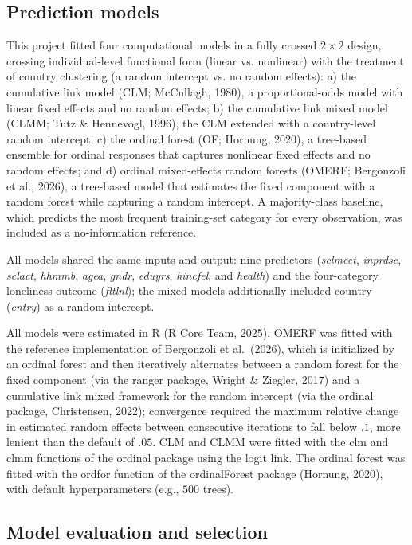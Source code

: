 \documentclass[12pt]{article}
\newcommand{\code}[1]{\textit{#1}}
\newcommand{\soft}[1]{\textnormal{#1}}
\begin{document}
\subsection{Prediction models}

This project fitted four computational models in a fully crossed $2 \times 2$ design, 
crossing individual-level functional form (linear vs. nonlinear) with 
the treatment of country clustering (a random intercept vs. no random effects): a) the cumulative link 
model (CLM; McCullagh, 1980), a proportional-odds
model with linear fixed effects and no random effects; b) the cumulative link mixed
model (CLMM; Tutz \& Hennevogl, 1996), the CLM extended with a country-level random intercept; c) the
ordinal forest (OF; Hornung, 2020), a tree-based ensemble for ordinal responses that captures
nonlinear fixed effects and no random effects; and d) ordinal
mixed-effects random forests (OMERF; Bergonzoli et al., 2026), a tree-based model that estimates the fixed component
with a random forest while capturing a random intercept. 
A majority-class baseline, which predicts the most frequent training-set category
for every observation, was included as a no-information reference.

All models shared the same inputs and output: nine predictors (\code{sclmeet},
\code{inprdsc}, \code{sclact}, \code{hhmmb}, \code{agea}, \code{gndr}, \code{eduyrs},
\code{hincfel}, and \code{health}) and the four-category loneliness outcome
(\code{fltlnl}); the mixed models additionally included country (\code{cntry}) as a random
intercept.

All models were estimated in \soft{R} (R Core Team, 2025). OMERF was fitted with the reference implementation of
Bergonzoli et al.\ (2026), which is initialized by an ordinal forest and then iteratively
alternates between a random forest for the fixed component (via the \soft{ranger} package,
Wright \& Ziegler, 2017) and a cumulative link mixed framework for the random intercept (via the
\soft{ordinal} package, Christensen, 2022); convergence required the maximum relative change in 
estimated random effects between consecutive iterations to fall below $.1$, more lenient than the default of $.05$.
CLM and CLMM were fitted with the \soft{clm} and \soft{clmm} functions of the
\soft{ordinal} package using the logit link. The ordinal forest was fitted with the \soft{ordfor} function of the
\soft{ordinalForest} package (Hornung, 2020), with default hyperparameters (e.g., $500$ trees).

\subsection{Model evaluation and selection}
\end{document}
